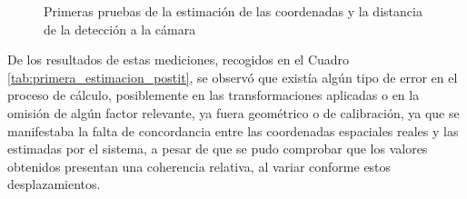   \begin{figure}[H]
     \centering
     \begin{center}
       \subcapcentertrue
       \hspace{2mm}
     \end{center}
     \caption{Primeras pruebas de la estimación de las coordenadas y la distancia de la detección a la cámara}
    \label{fig:primera_estimacion_postit}
  \end{figure}

De los resultados de estas mediciones, recogidos en el Cuadro \ref{tab:primera_estimacion_postit}, se observó que existía algún tipo de error en el proceso de cálculo, posiblemente en las transformaciones aplicadas o en la omisión de algún factor relevante, ya fuera geométrico o de calibración, ya que se manifestaba la falta de concordancia entre las coordenadas espaciales reales y las estimadas por el sistema, a pesar de que se pudo comprobar que los valores obtenidos presentan una coherencia relativa, al variar conforme estos desplazamientos.

